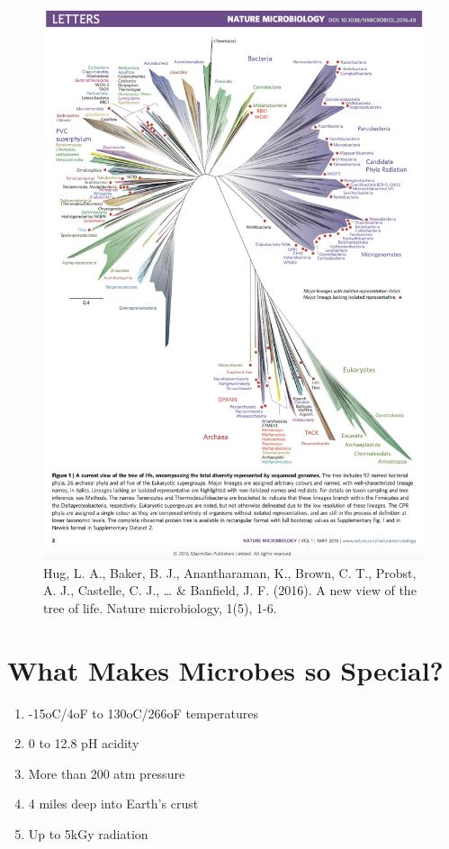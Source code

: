 \documentclass[
]{book}
\providecommand{\tightlist}{%
  \setlength{\itemsep}{0pt}\setlength{\parskip}{0pt}}
\begin{document}
\begin{figure}
\centering
\includegraphics[width=1\textwidth,height=\textheight]{./Figures/TreeofLife16.png}
\caption{Hug, L. A., Baker, B. J., Anantharaman, K., Brown, C. T., Probst, A. J., Castelle, C. J., \ldots{} \& Banfield, J. F. (2016). A new view of the tree of life. Nature microbiology, 1(5), 1-6.}
\end{figure}

\hypertarget{what-makes-microbes-so-special}{%
\section{What Makes Microbes so Special?}\label{what-makes-microbes-so-special}}

\begin{enumerate}
\def\labelenumi{\arabic{enumi}.}
\tightlist
\item
  -15oC/4oF to 130oC/266oF temperatures
\item
  0 to 12.8 pH acidity
\item
  More than 200 atm pressure
\item
  4 miles deep into Earth's crust
\item
  Up to 5kGy radiation
\end{enumerate}
\end{document}
